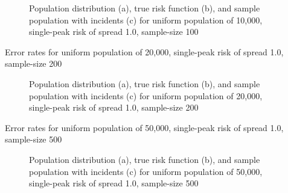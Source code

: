 {\begin{figure}[H]
    
    \caption[]{Population distribution (a), true risk function (b), and sample population with incidents (c) for uniform population of 10,000, single-peak risk of \gls{spread} 1.0, sample-size 100}
    \label{fig:distributions:unif10k_100_1.0_1h}    
\end{figure} \newpage



\begin{table}[H]
    
    \caption[]{Error rates for uniform population of 20,000, single-peak risk of \gls{spread} 1.0, sample-size 200}
    \label{tab:mean_error_rates:unif20k_200_1.0_1h}
\end{table}

\begin{figure}[H]
    
    \caption[]{Population distribution (a), true risk function (b), and sample population with incidents (c) for uniform population of 20,000, single-peak risk of \gls{spread} 1.0, sample-size 200}
    \label{fig:distributions:unif20k_200_1.0_1h}    
\end{figure} \newpage



\begin{table}[H]
    
    \caption[]{Error rates for uniform population of 50,000, single-peak risk of \gls{spread} 1.0, sample-size 500}
    \label{tab:mean_error_rates:unif50k_500_1.0_1h}
\end{table}

\begin{figure}[H]
    
    \caption[]{Population distribution (a), true risk function (b), and sample population with incidents (c) for uniform population of 50,000, single-peak risk of \gls{spread} 1.0, sample-size 500}
    \label{fig:distributions:unif50k_500_1.0_1h}    
\end{figure} \newpage



}
